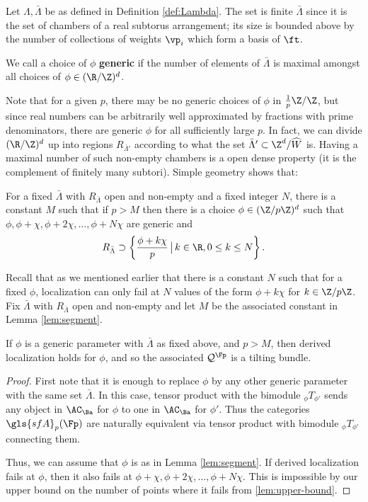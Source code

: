 Let $\Lambda,\bar{\Lambda}$ be as defined in Definition \ref{def:Lambda}.  The set is finite $\bar{\Lambda}$ since it is the set of chambers of a real subtorus arrangement; its size is bounded above by the number of collections of weights $\vp_i$ which form a basis of $\ft$.  
\begin{definition}
 We call a choice of $\phi$ {\bf generic} if the number of elements of $ \bar \Lambda$ is maximal amongst all choices of $\phi\in (\R/\Z)^d$.  
\end{definition}
Note that for a given $p$, there may be no generic choices of $\phi$ in $\frac{1}{p}\Z/\Z$, but since real numbers can be arbitrarily well approximated by fractions with prime denominators, there are generic $\phi$ for all sufficiently large $p$.   In fact, we can divide $(\R/\Z)^d$ up into regions $R_{\bar{\Lambda}'}$ according to  what the set $\bar \Lambda'\subset \Z^d/\widehat{W}$ is.  Having a maximal number of such non-empty chambers is a open dense property (it is the complement of finitely many subtori).  Simple geometry shows that:
\begin{lemma}\label{lem:segment}
For a fixed $\bar{\Lambda}$ with $R_{\bar{\Lambda}}$ open and non-empty and a fixed integer $N$, there is a constant $M$ such that if $p>M$ then there is a choice $\phi\in (\Z/p\Z)^d$ such that $\phi,\phi+\chi,\phi+2\chi,\dots, \phi+N\chi$ are generic and \[R_{\bar{\Lambda}}\supset \left\{\frac{\phi+k\chi}{p}\,\big| \,k\in \R, 0\leq k\leq N\right\}.\]
\end{lemma}
Recall that as we mentioned earlier that there is a constant $N$ such that for a fixed $\phi$, localization can only fail at $N$ values of the form $\phi+k\chi$ for $k\in \Z/p\Z$.  Fix $\bar{\Lambda}$ with $R_{\bar{\Lambda}}$ open and non-empty and let $M$ be the associated constant in Lemma \ref{lem:segment}.
\begin{theorem}\label{thm:asymptotic-derived}
  If $\phi$ is a generic parameter with $\bar{\Lambda}$ as fixed above, and $p>M$, then derived localization holds for $\phi$, and so the associated $\mathcal{Q}^{\Fp}$ is a tilting bundle.  
\end{theorem}
\begin{proof}
  First note that it is enough to replace $\phi$ by any other generic parameter with the same set $\bar{\Lambda}$. In this case,  tensor product with the bimodule ${}_{\phi}T_{\phi'}$  sends any object in $\AC_{\Ba}$ for $\phi$ to one in $\AC_{\Ba}$ for $\phi'$.  Thus the categories $\gls{sfA}_p(\Fp)$ are naturally equivalent via tensor product with bimodule ${}_{\phi}T_{\phi'}$ connecting them. 
  
  Thus, we can assume that $\phi$ is as in Lemma \ref{lem:segment}.  If derived localization fails at $\phi$, then it also fails at $\phi+\chi,\phi+2\chi,\dots, \phi+N\chi$.  This is impossible by our upper bound on the number of points where it fails from \ref{lem:upper-bound}.
\end{proof}

